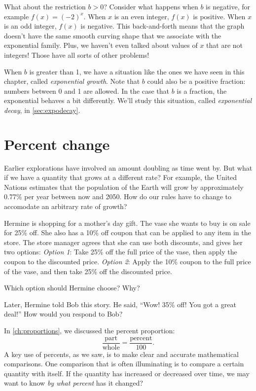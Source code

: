 What about the restriction $b>0$? Consider what happens when $b$ is negative, for example $f(x)=(-2)^x$. When $x$ is an even integer, $f(x)$ is positive. When $x$ is an odd integer, $f(x)$ is negative. This back-and-forth means that the graph doesn't have the same smooth curving shape that we associate with the exponential family. Plus, we haven't even talked about values of $x$ that are not integers! Those have all sorts of other problems!

When $b$ is greater than 1, we have a situation like the ones we have seen in this chapter, called \textit{exponential growth}. Note that $b$ could also be a positive fraction: numbers between 0 and 1 are allowed. In the case that $b$ is a fraction, the exponential behaves a bit differently. We'll study this situation, called \textit{exponential decay}, in \cref{sec:expodecay}.


\section{Percent change}
\label{sec:expopercentchange}

Earlier explorations have involved an amount doubling as time went by. But what if we have a quantity that grows at a different rate? For example, the United Nations estimates that the population of the Earth will grow by approximately 0.77\% per year between now and 2050. How do our rules have to change to accomodate an arbitrary rate of growth?

\begin{boxexplore}
Hermine is shopping for a mother's day gift. The vase she wants to buy is on sale for 25\% off. She also has a 10\% off coupon that can be applied to any item in the store. The store manager agrees that she can use both discounts, and gives her two options: \textit{Option 1}: Take 25\% off the full price of the vase, then apply the coupon to the discounted price. \textit{Option 2}: Apply the 10\% coupon to the full price of the vase, and then take 25\% off the discounted price.

Which option should Hermine choose? Why?

Later, Hermine told Bob this story. He said, ``Wow! 35\% off! You got a great deal!'' How would you respond to Bob?
\end{boxexplore}

In \cref{ch:proportions}, we discussed the percent proportion:
\[\frac{\text{part}}{\text{whole}} = \frac{\text{percent}}{100}.\]
A key use of percents, as we saw, is to make clear and accurate mathematical comparisons. One comparison that is often illuminating is to compare a certain quantity with itself. If the quantity has increased or decreased over time, we may want to know \textit{by what percent} has it changed?

